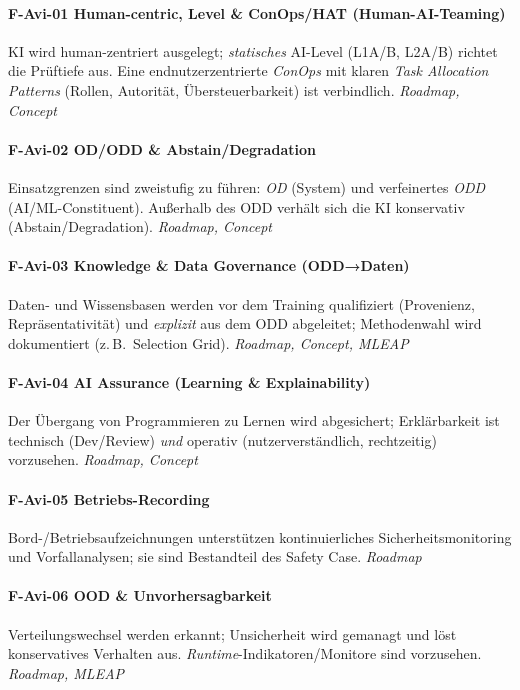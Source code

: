 \paragraph {F-Avi-01 Human-centric, Level \& ConOps/HAT (Human-AI-Teaming)}
  {KI wird human-zentriert ausgelegt; \emph{statisches} AI-Level (L1A/B, L2A/B) richtet die Prüftiefe aus. Eine endnutzerzentrierte \emph{ConOps} mit klaren \emph{Task Allocation Patterns} (Rollen, Autorität, Übersteuerbarkeit) ist verbindlich. \textit{Roadmap, Concept}}

\paragraph {F-Avi-02 OD/ODD \& Abstain/Degradation}
  {Einsatzgrenzen sind zweistufig zu führen: \emph{OD} (System) und verfeinertes \emph{ODD} (AI/ML-Constituent). Außerhalb des ODD verhält sich die KI konservativ (Abstain/Degradation). \textit{Roadmap, Concept}}

\paragraph {F-Avi-03 Knowledge \& Data Governance (ODD→Daten)}
  {Daten- und Wissensbasen werden vor dem Training qualifiziert (Provenienz, Repräsentativität) und \emph{explizit} aus dem ODD abgeleitet; Methodenwahl wird dokumentiert (z.\,B.\ Selection Grid). \textit{Roadmap, Concept, MLEAP}}

\paragraph {F-Avi-04 AI Assurance (Learning \& Explainability)}
  {Der Übergang von Programmieren zu Lernen wird abgesichert; Erklärbarkeit ist technisch (Dev/Review) \emph{und} operativ (nutzerverständlich, rechtzeitig) vorzusehen. \textit{Roadmap, Concept}}

\paragraph {F-Avi-05 Betriebs-Recording}
  {Bord-/Betriebsaufzeichnungen unterstützen kontinuierliches Sicherheitsmonitoring und Vorfallanalysen; sie sind Bestandteil des Safety Case. \textit{Roadmap}}

\paragraph {F-Avi-06 OOD \& Unvorhersagbarkeit}
  {Verteilungswechsel werden erkannt; Unsicherheit wird gemanagt und löst konservatives Verhalten aus. \emph{Runtime}-Indikatoren/Monitore sind vorzusehen. \textit{Roadmap, MLEAP}}

